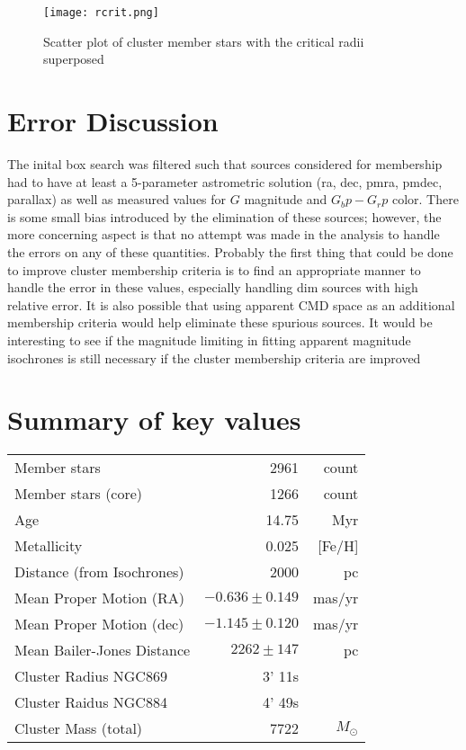 \documentclass[twocolumn]{aastex631}
\begin{document}
\begin{figure}[h]
\centering
\texttt{[image: rcrit.png]} 
\caption{Scatter plot of cluster member stars with the critical radii superposed}
\label{fig:rcrit}
\end{figure}

\section{Error Discussion}
The inital box search was filtered such that sources considered for membership had to have at least a 5-parameter astrometric solution (ra, dec, pmra, pmdec, parallax) as well as measured values for $G$ magnitude and $G_bp-G_rp$ color. There is some small bias introduced by the elimination of these sources; however, the more concerning aspect is that no attempt was made in the analysis to handle the errors on any of these quantities. Probably the first thing that could be done to improve cluster membership criteria is to find an appropriate manner to handle the error in these values, especially handling dim sources with high relative error.  It is also possible that using apparent CMD space as an additional membership criteria would help eliminate these spurious sources. It would be interesting to see if the magnitude limiting in fitting apparent magnitude isochrones is still necessary if the cluster membership criteria are improved

\section{Summary of key values}
\begin{tabular}{ l r r } 
Member stars & 2961 & count \\
Member stars (core) & 1266 & count \\
Age & 14.75 & Myr \\
Metallicity & 0.025 & [Fe/H] \\
Distance (from Isochrones) & 2000 & pc \\
Mean Proper Motion (RA) & $-0.636 \pm 0.149$ & mas/yr\\
Mean Proper Motion (dec) & $-1.145 \pm 0.120$ & mas/yr\\
Mean Bailer-Jones Distance & $2262 \pm 147$ & pc \\
Cluster Radius NGC869 & 3' 11s & \\
Cluster Raidus NGC884 & 4' 49s& \\
Cluster Mass  (total) & 7722 & $M_\odot$ \\
\end{tabular}




\end{document}
